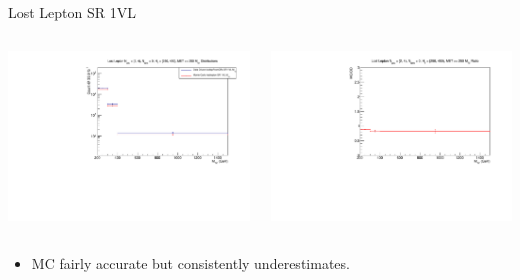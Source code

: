 \documentclass{beamer}
\begin{document}
\begin{frame}{Lost Lepton SR 1VL}
\begin{columns}
\begin{column}{0.5\textwidth}
\begin{flushleft}\includegraphics[scale=0.3]{PDFs/lostlep_estimates_1VL}\end{flushleft}
\end{column}
\begin{column}{0.5\textwidth}
\begin{flushright}\includegraphics[scale=0.3]{PDFs/lostlep_ratio_1VL}\end{flushright}
\end{column}
\end{columns}
\begin{itemize}
\item MC fairly accurate but consistently underestimates.
\end{itemize}
\end{frame}
\end{document}
